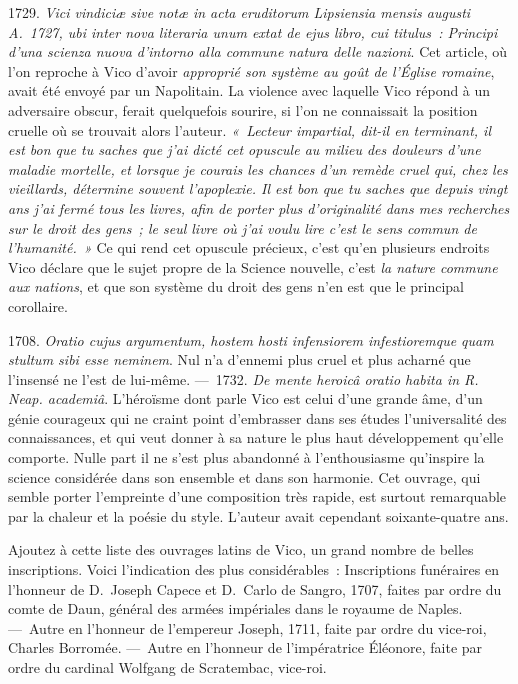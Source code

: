 \documentclass[french,twoside]{book} %
\begin{document}
1729. {\itshape Vici vindiciæ sive notæ in acta eruditorum Lipsiensia mensis augusti A. 1727, ubi inter nova literaria unum extat de ejus libro, cui titulus : Principi d’una scienza nuova d’intorno alla commune natura delle nazioni}. Cet article, où l’on reproche à Vico d’avoir \emph{{\itshape approprié son système au goût de l’Église romaine}}, avait été envoyé par un Napolitain. La violence avec laquelle Vico répond à un adversaire obscur, ferait quelquefois sourire, si l’on ne connaissait la position cruelle où se trouvait alors l’auteur. \emph{« Lecteur impartial, dit-il en terminant, il est bon que tu saches que j’ai dicté cet opuscule au milieu des douleurs d’une maladie mortelle, et lorsque je courais les chances d’un remède cruel qui, chez les vieillards, détermine souvent l’apoplexie. Il est bon que tu saches que depuis vingt ans j’ai fermé tous les livres, afin de porter plus d’originalité dans mes recherches sur le droit des gens ; le seul livre où j’ai voulu lire c’est le sens commun de l’humanité. »} Ce qui rend cet opuscule précieux, c’est qu’en plusieurs endroits Vico déclare que le sujet propre de la Science nouvelle, c’est {\itshape la nature commune aux nations}, et que son système du droit des gens n’en est que le principal corollaire.\par
1708. {\itshape Oratio cujus argumentum, hostem hosti infensiorem infestioremque quam stultum sibi esse neminem}. Nul n’a d’ennemi plus cruel et plus acharné que l’insensé ne l’est de lui-même. — 1732. {\itshape De mente heroicâ oratio habita in R. Neap. academiâ}. L’héroïsme dont parle Vico est celui d’une grande âme, d’un génie courageux qui ne craint point d’embrasser dans ses études l’universalité des connaissances, et qui veut donner à sa nature le plus haut développement qu’elle comporte. Nulle part il ne s’est plus abandonné à l’enthousiasme qu’inspire la science considérée dans son ensemble et dans son harmonie. Cet ouvrage, qui semble porter l’empreinte d’une composition très rapide,  est surtout remarquable par la chaleur et la poésie du style. L’auteur avait cependant soixante-quatre ans.\par
Ajoutez à cette liste des ouvrages latins de Vico, un grand nombre de belles inscriptions. Voici l’indication des plus considérables : Inscriptions funéraires en l’honneur de D. Joseph Capece et D. Carlo de Sangro, 1707, faites par ordre du comte de Daun, général des armées impériales dans le royaume de Naples. — Autre en l’honneur de l’empereur Joseph, 1711, faite par ordre du vice-roi, Charles Borromée. — Autre en l’honneur de l’impératrice Éléonore, faite par ordre du cardinal Wolfgang de Scratembac, vice-roi.\par
\end{document}
